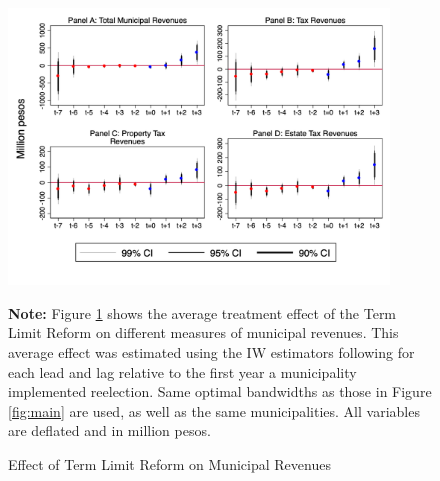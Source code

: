 \documentclass[12pt]{amsart}
\numberwithin{equation}{section}
\theoremstyle{definition}
\theoremstyle{definition}
\theoremstyle{definition}
\begin{document}
  
\begin{figure}[h]   
\centering
 \caption{Effect of Term Limit Reform on Municipal Revenues}
 \label{fig:revenues1}
\includegraphics[width=0.9\textwidth]{../Figures/revenues_allyears1.png}
       \captionsetup{justification=centering}
         
 \textbf{Note:}  Figure \ref{fig:revenues1} shows the average treatment effect of the Term Limit Reform on different measures of municipal revenues. This average effect was estimated using the IW estimators following \citet{abraham_sun_2020} for each lead and lag relative to the first year a municipality implemented reelection. Same optimal bandwidths as those in Figure \ref{fig:main} are used, as well as the same municipalities. All variables are deflated and in million pesos. 
\end{figure}   
\end{document}
